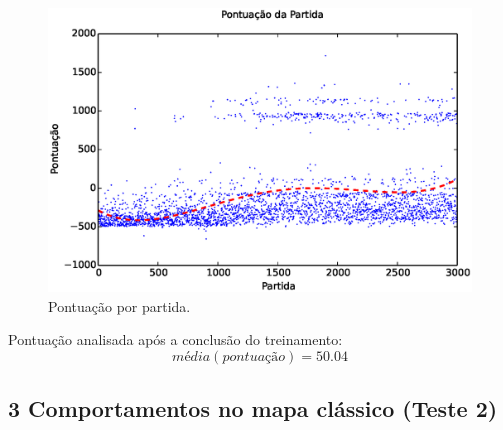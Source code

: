 \documentclass{beamer}
\begin{document}

\begin{frame}
\begin{figure}[h]
    \centering
    \includegraphics[width=0.7\linewidth]{images/3_behaviors_small_map/match_scores____pol}
    \caption{Pontuação por partida.}
    \label{img:3ComportamentosMapaPequeno:PontuacaoPorPartida}
\end{figure}

Pontuação analisada após a conclusão do treinamento:
$$ \textit{média} \left( \textit{pontuação} \right) = 50.04 $$
\end{frame}


\subsection{3 Comportamentos no mapa clássico (Teste 2)}
\end{document}
